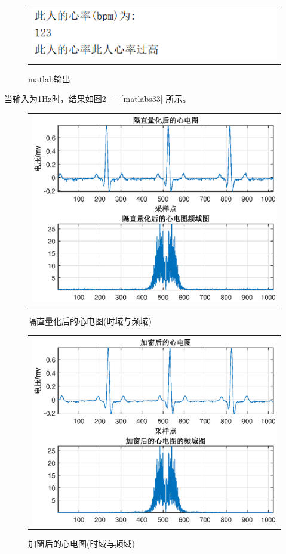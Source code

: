 \documentclass[12pt]{article}
\begin{document}
\begin{figure}[htbp]
  \centering
  \begin{tabular}{c}
  \includegraphics[width=.8\textwidth]{x2}
  \end{tabular}
  \caption{matlab输出}\label{matlabs23}
\end{figure}\par
当输入为1Hz时，结果如图\ref{matlabs31}\ $-$\ \ref{matlabs33}
所示。
\begin{figure}[htbp]
  \centering
  \begin{tabular}{c}
  \includegraphics[width=.8\textwidth]{g3}
  \end{tabular}
  \caption{隔直量化后的心电图(时域与频域)}\label{matlabs31}
\end{figure}
\begin{figure}[htbp]
  \centering
  \begin{tabular}{c}
  \includegraphics[width=.8\textwidth]{j3}
  \end{tabular}
  \caption{加窗后的心电图(时域与频域)}\label{matlabs32}
\end{figure}
\end{document}
